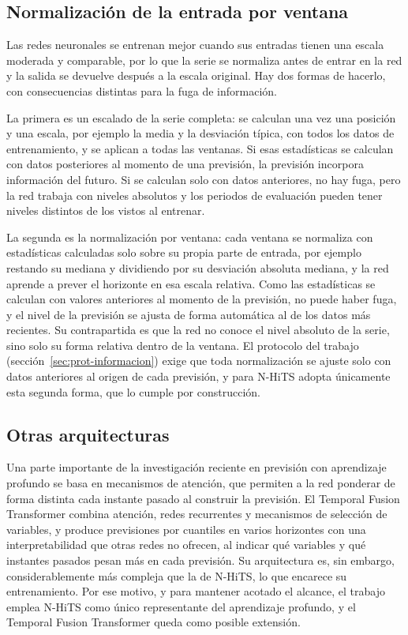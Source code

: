 \subsection{Normalización de la entrada por ventana}\label{sec:normalizacion}

Las redes neuronales se entrenan mejor cuando sus entradas tienen una escala
moderada y comparable, por lo que la serie se normaliza antes de entrar en
la red y la salida se devuelve después a la escala original. Hay dos formas
de hacerlo, con consecuencias distintas para la fuga de información.

La primera es un escalado de la serie completa: se calculan una vez una
posición y una escala, por ejemplo la media y la desviación típica, con todos
los datos de entrenamiento, y se aplican a todas las ventanas. Si esas
estadísticas se calculan con datos posteriores al momento de una previsión,
la previsión incorpora información del futuro. Si se calculan solo con datos
anteriores, no hay fuga, pero la red trabaja con niveles absolutos y los
periodos de evaluación pueden tener niveles distintos de los vistos al
entrenar.

La segunda es la normalización por ventana: cada ventana se normaliza con
estadísticas calculadas solo sobre su propia parte de entrada, por ejemplo
restando su mediana y dividiendo por su desviación absoluta mediana, y la red
aprende a prever el horizonte en esa escala relativa. Como las estadísticas
se calculan con valores anteriores al momento de la previsión, no puede
haber fuga, y el nivel de la previsión se ajusta de forma automática al de
los datos más recientes. Su contrapartida es que la red no conoce el nivel
absoluto de la serie, sino solo su forma relativa dentro de la ventana. El
protocolo del trabajo (sección~\ref{sec:prot-informacion}) exige que toda
normalización se ajuste solo con datos anteriores al origen de cada
previsión, y para N-HiTS adopta únicamente esta segunda forma, que lo cumple
por construcción.

\subsection{Otras arquitecturas}\label{sec:otras-arquitecturas}

Una parte importante de la investigación reciente en previsión con
aprendizaje profundo se basa en mecanismos de atención, que permiten a la
red ponderar de forma distinta cada instante pasado al construir la
previsión. El Temporal Fusion Transformer \parencite{lim2021temporal}
combina atención, redes recurrentes y mecanismos de selección de variables, y
produce previsiones por cuantiles en varios horizontes con una
interpretabilidad que otras redes no ofrecen, al indicar qué variables y qué
instantes pasados pesan más en cada previsión. Su arquitectura es, sin
embargo, considerablemente más compleja que la de N-HiTS, lo que encarece su
entrenamiento. Por ese motivo, y para mantener acotado el alcance, el trabajo emplea N-HiTS como único representante del
aprendizaje profundo, y el Temporal Fusion Transformer queda como posible
extensión.

